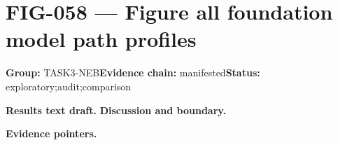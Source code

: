 \clearpage
\section{FIG-058 --- Figure all foundation model path profiles}
\label{figpage:fig-058}
\textbf{Group:} TASK3-NEB\quad \textbf{Evidence chain:} manifested\quad \textbf{Status:} exploratory;audit;comparison

\textbf{Results text draft.} 
\textbf{Discussion and boundary.} 


\textbf{Evidence pointers.}



\vfill

